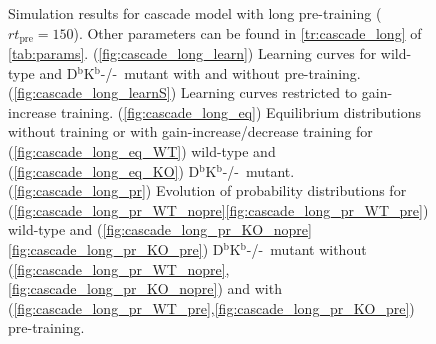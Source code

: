 \documentclass[12pt]{article}
\newcommand{\KO}{D$^\mathrm{b}$K$^\mathrm{b}$-/-}
\begin{document}
\begin{figure}
 \begin{center}
 \begin{myenuma}
  \item{}\label{fig:cascade_long_learn}
  \item{}\label{fig:cascade_long_learnS}
  \item\label{fig:cascade_long_eq}\begin{myenumi}
                    \item{}\label{fig:cascade_long_eq_WT}
                    \item{}\label{fig:cascade_long_eq_KO}
                  \end{myenumi}
  \item\label{fig:cascade_long_pr}\begin{myenumi}
                    \item{}\label{fig:cascade_long_pr_WT_nopre}
                    \item{}\label{fig:cascade_long_pr_WT_pre}
                    \item{}\label{fig:cascade_long_pr_KO_nopre}
                    \item{}\label{fig:cascade_long_pr_KO_pre}
                  \end{myenumi}
 \end{myenuma}
 \end{center}
  \caption{Simulation results for cascade model with long pre-training ($rt_\text{pre}=150$).
  Other parameters can be found in \autoref{tr:cascade_long} of \autoref{tab:params}.
  (\ref{fig:cascade_long_learn}) Learning curves for wild-type and \KO\ mutant with and without pre-training.
  (\ref{fig:cascade_long_learnS}) Learning curves restricted to gain-increase training.
  (\ref{fig:cascade_long_eq}) Equilibrium distributions without training or with gain-increase/decrease training for (\ref{fig:cascade_long_eq_WT}) wild-type and (\ref{fig:cascade_long_eq_KO}) \KO\ mutant.
  (\ref{fig:cascade_long_pr}) Evolution of probability distributions for (\ref{fig:cascade_long_pr_WT_nopre}\ref{fig:cascade_long_pr_WT_pre}) wild-type and  (\ref{fig:cascade_long_pr_KO_nopre}\ref{fig:cascade_long_pr_KO_pre}) \KO\ mutant without (\ref{fig:cascade_long_pr_WT_nopre},\ref{fig:cascade_long_pr_KO_nopre}) and with (\ref{fig:cascade_long_pr_WT_pre},\ref{fig:cascade_long_pr_KO_pre}) pre-training. } \label{fig:cascade_long}
\end{figure}
\end{document}
